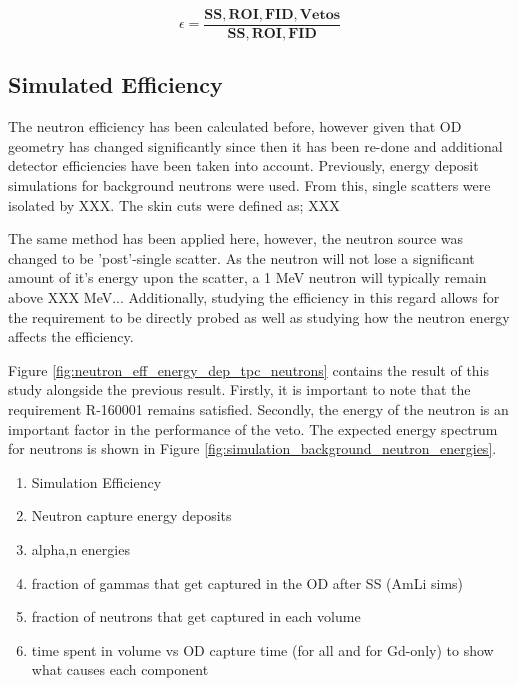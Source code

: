 \begin{equation}
    \epsilon = \frac{\mathbf{SS, ROI, FID, Vetos}}{\mathbf{SS, ROI, FID}}
    \label{eq:neutron_efficiency}
\end{equation}


\subsection{Simulated Efficiency}
\par
The neutron efficiency has been calculated before, however given that OD geometry has changed significantly since then it has been re-done and additional detector efficiencies have been taken into account.
Previously, energy deposit simulations for background neutrons were used. 
From this, single scatters were isolated by XXX.
The skin cuts were defined as; XXX


\par
The same method has been applied here, however, the neutron source was changed to be 'post'-single scatter. 
As the neutron will not lose a significant amount of it's energy upon the scatter, a 1 MeV neutron will typically remain above XXX MeV...
Additionally, studying the efficiency in this regard allows for the requirement to be directly probed as well as studying how the neutron energy affects the efficiency.

\par
Figure \ref{fig:neutron_eff_energy_dep_tpc_neutrons} contains the result of this study alongside the previous result.
Firstly, it is important to note that the requirement R-160001 remains satisfied.
Secondly, the energy of the neutron is an important factor in the performance of the veto.
The expected energy spectrum for neutrons is shown in Figure \ref{fig:simulation_background_neutron_energies}.


\begin{tcolorbox}[colback=red!5!white, colframe=red!50!black, title=Key Plots]
\begin{enumerate}
    \item Simulation Efficiency
    \item Neutron capture energy deposits
    \item alpha,n energies
    \item fraction of gammas that get captured in the OD after SS (AmLi sims)
    \item fraction of neutrons that get captured in each volume
    \item time spent in volume vs OD capture time (for all and for Gd-only) to show what causes each component
\end{enumerate}
\end{tcolorbox}


